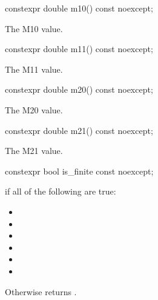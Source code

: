 \begin{itemdecl}
constexpr double m10() const noexcept;
\end{itemdecl}
\begin{itemdescr}
\pnum
\returns
The M10 value.
\end{itemdescr}

\begin{itemdecl}
constexpr double m11() const noexcept;
\end{itemdecl}
\begin{itemdescr}
\pnum
\returns
The M11 value.
\end{itemdescr}

\begin{itemdecl}
constexpr double m20() const noexcept;
\end{itemdecl}
\begin{itemdescr}
\pnum
\returns
The M20 value.
\end{itemdescr}

\begin{itemdecl}
constexpr double m21() const noexcept;
\end{itemdecl}
\begin{itemdescr}
\pnum
\returns
The M21 value.
\end{itemdescr}

\begin{itemdecl}
constexpr bool is_finite const noexcept;
\end{itemdecl}
\begin{itemdescr}
\pnum
\returns
{} if all of the following are true:
\begin{itemize}
\item {}
\item {}
\item {}
\item {}
\item {}
\item {}
\end{itemize}

\pnum
Otherwise returns .
\end{itemdescr}

